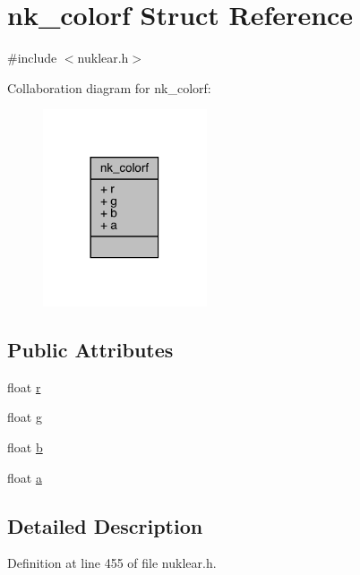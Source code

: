 \hypertarget{structnk__colorf}{}\section{nk\+\_\+colorf Struct Reference}
\label{structnk__colorf}


{\ttfamily \#include $<$nuklear.\+h$>$}



Collaboration diagram for nk\+\_\+colorf\+:
\nopagebreak
\begin{figure}[H]
\begin{center}
\leavevmode
\includegraphics[width=137pt]{structnk__colorf__coll__graph}
\end{center}
\end{figure}
\subsection*{Public Attributes}
\begin{DoxyCompactItemize}
\item 
float \mbox{\hyperlink{structnk__colorf_a19908af2a694aa5dd2f0d045b5bc69c1}{r}}
\item 
float \mbox{\hyperlink{structnk__colorf_a41ff42d9dce5f1812132b305cf3395fb}{g}}
\item 
float \mbox{\hyperlink{structnk__colorf_a616fe0dea8242077a5f13bc0296bde85}{b}}
\item 
float \mbox{\hyperlink{structnk__colorf_aff9db540076346a2563bab0d7cd9ef86}{a}}
\end{DoxyCompactItemize}


\subsection{Detailed Description}


Definition at line 455 of file nuklear.\+h.



